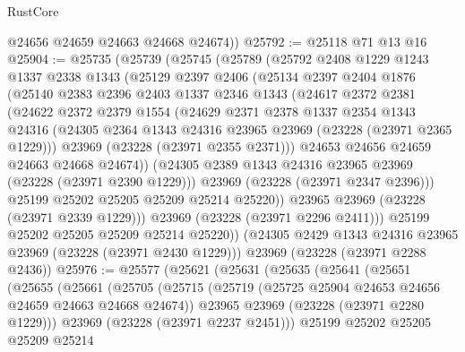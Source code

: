 \begin{lexlean}{RustCore}
\begin{coremodule}
        @24656
        @24659
        @24663
        @24668
        @24674))
@25792 := @25118 @71 @13 @16
@25904 := @25735
    (@25739
      (@25745
        (@25789
          (@25792
            @2408
            @1229
            @1243
            @1337
            @2338
            @1343
            (@25129
              @2397
              @2406
              (@25134
                @2397
                @2404
                @1876
                (@25140
                  @2383
                  @2396
                  @2403
                  @1337
                  @2346
                  @1343
                  (@24617
                    @2372
                    @2381
                    (@24622
                      @2372
                      @2379
                      @1554
                      (@24629
                        @2371
                        @2378
                        @1337
                        @2354
                        @1343
                        @24316
                        (@24305 @2364 @1343 @24316 @23965 @23969 (@23228 (@23971 @2365 @1229)))
                        @23969
                        (@23228 (@23971 @2355 @2371)))
                      @24653
                      @24656
                      @24659
                      @24663
                      @24668
                      @24674))
                  (@24305 @2389 @1343 @24316 @23965 @23969 (@23228 (@23971 @2390 @1229)))
                  @23969
                  (@23228 (@23971 @2347 @2396)))
                @25199
                @25202
                @25205
                @25209
                @25214
                @25220))
            @23965
            @23969
            (@23228 (@23971 @2339 @1229)))
          @23969
          (@23228 (@23971 @2296 @2411)))
        @25199
        @25202
        @25205
        @25209
        @25214
        @25220))
    (@24305 @2429 @1343 @24316 @23965 @23969 (@23228 (@23971 @2430 @1229)))
    @23969
    (@23228 (@23971 @2288 @2436))
@25976 := @25577
    (@25621
      (@25631
        (@25635
          (@25641
            (@25651
              (@25655
                (@25661
                  (@25705
                    (@25715
                      (@25719 (@25725 @25904 @24653 @24656 @24659 @24663 @24668 @24674))
                      @23965
                      @23969
                      (@23228 (@23971 @2280 @1229)))
                    @23969
                    (@23228 (@23971 @2237 @2451)))
                  @25199
                  @25202
                  @25205
                  @25209
                  @25214

\end{coremodule}
\end{lexlean}
